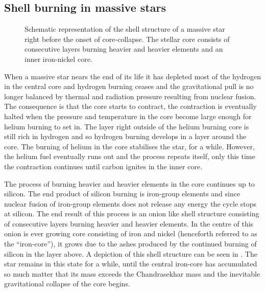 \subsection{Shell burning in massive stars}
\begin{wrapfigure}{r}{0.5\textwidth}
\caption{Schematic representation of the shell structure of a massive star right before
the onset of core-collapse. The stellar core consists of consecutive layers burning heavier
and heavier elements and an inner iron-nickel core.}
 \label{figSN:onion}
\end{wrapfigure}
When a massive star nears the end of its life it has depleted most of the hydrogen in the central core
and hydrogen burning ceases and the gravitational pull is no longer balanced by thermal and radiation pressure resulting
from nuclear fusion. The consequence is that the core starts to contract, the contraction is eventually halted when the pressure
and temperature in the core become large enough for helium burning to set in. The layer right outside of the helium burning core is still rich
in hydrogen and so hydrogen burning develops in a layer around the core. The burning of helium in the core stabilises the star, for a while.
However, the helium fuel eventually runs out and the process repeats itself, only this time the contraction continues until carbon ignites in the inner core. 

The process of burning heavier and heavier elements in the core continues up to silicon. The end product of silicon burning is iron-group elements and
since nuclear fusion of iron-group elements does not release any energy the cycle stops at silicon. The end result of this process is
an onion like shell structure consisting of consecutive layers burning heavier and heavier elements. In the centre of this onion is ever growing
core consisting of iron and nickel (henceforth referred to as the ``iron-core''), it grows due to the ashes produced by the continued burning of silicon in the layer above. A depiction of this shell structure can be seen in .
The star remains in this state for a while,
until the central iron-core has accumulated so much matter that its mass exceeds the Chandrasekhar mass and the inevitable gravitational collapse 
of the core begins.

